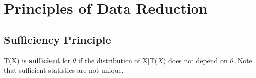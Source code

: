 \documentclass[11pt,fleqn]{book} %
\begin{document}







\chapter{Principles of Data Reduction}

\section{Sufficiency Principle}

\begin{definition}[Sufficient]
	T(X) is \textbf{sufficient} for $\theta$ if the distribution of X|T($\underline{X}$) does not depend on $\theta$. Note that sufficient statistics are not unique.
\end{definition}
\end{document}
